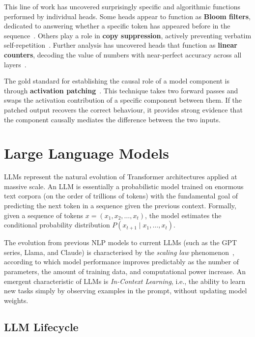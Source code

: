 This line of work has uncovered surprisingly specific and algorithmic functions performed by
individual heads. Some heads appear to function as \textbf{Bloom filters}, dedicated to answering
whether a specific token has appeared before in the sequence~\cite{BloomFilters}. Others play a
role in \textbf{copy suppression}, actively preventing verbatim self-repetition~\cite{CopySuppression}.
Further analysis has uncovered heads that function as \textbf{linear counters}, decoding the
value of numbers with near-perfect accuracy across all layers~\cite{MechanisticCounting}.

The gold standard for establishing the causal role of a model component is through
\textbf{activation patching}~\cite{ActivationPatching}. This technique takes two forward passes
and swaps the activation contribution of a specific component between them. If the patched output
recovers the correct behaviour, it provides strong evidence that the component causally mediates
the difference between the two inputs.



\section{Large Language Models}


LLMs represent the natural evolution of Transformer architectures applied at massive scale. An
LLM is essentially a probabilistic model trained on enormous text corpora (on the order of
trillions of tokens) with the fundamental goal of predicting the next token in a sequence given
the previous context. Formally, given a sequence of tokens \(x = (x_1, x_2, \ldots, x_t)\), the
model estimates the conditional probability distribution \(P(x_{t+1} \mid x_1, \ldots, x_t)\).

The evolution from previous NLP models to current LLMs (such as the GPT series, Llama, and
Claude) is characterised by the \textit{scaling law} phenomenon~\cite{ScalingLaws}, according to
which model performance improves predictably as the number of parameters, the amount of training
data, and computational power increase. An emergent characteristic of LLMs is \textit{In-Context
Learning}, i.e., the ability to learn new tasks simply by observing examples in the prompt,
without updating model weights.


\subsection{LLM Lifecycle}

